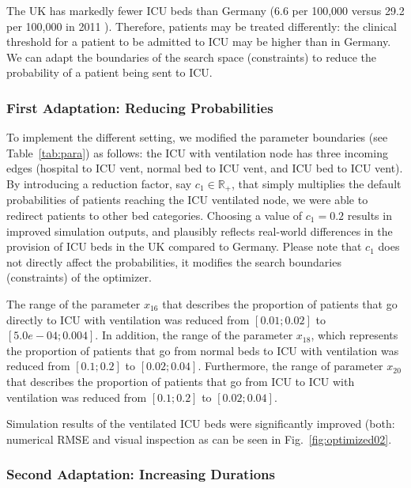 \documentclass[conference]{IEEEtran}
\begin{document}
The UK has markedly fewer ICU beds than Germany (6.6 per 100,000 versus 29.2 per 100,000 in 2011  \cite{rhodes_variability_2012}).
Therefore, patients may be treated differently: the clinical threshold for a patient to be admitted to ICU may be higher than in Germany. We can adapt the boundaries of the search space (constraints) to reduce the probability of a patient being sent to \gls{ICU}.

\subsubsection{First Adaptation: Reducing Probabilities}
To implement the different setting, we modified the parameter boundaries (see Table~\ref{tab:para})  as follows: the ICU with ventilation node has three incoming edges (hospital to ICU vent, normal bed to ICU vent, and ICU bed to ICU vent).
By introducing a reduction factor, say  $c_1 \in \mathbb{R_+}$, that simply multiplies the default probabilities of patients reaching the ICU ventilated node, we were able to redirect patients to other bed categories. 
Choosing a value of $c_1=0.2$ results in improved simulation outputs, and plausibly reflects real-world differences in the provision of ICU beds in the UK compared to Germany. Please note that $c_1$ does not directly affect the probabilities, it modifies the search boundaries (constraints) of the optimizer.

The range of the parameter 
$x_{16}$ that describes the proportion of patients that go directly to ICU with ventilation 
was reduced from $[0.01; 0.02]$ to $[5.0e-04; 0.004]$. In addition, the range of the parameter $x_{18}$, which represents the proportion of patients that go from normal beds to ICU with ventilation was reduced from $[0.1; 0.2]$ to $[0.02; 0.04]$. Furthermore, 
the range of parameter $x_{20}$ that describes the proportion of patients that go from ICU to ICU with ventilation was reduced from $[0.1; 0.2]$ to $[0.02; 0.04]$. 

Simulation results of the ventilated ICU beds were significantly improved (both: numerical RMSE and visual inspection as can be seen in Fig.~\ref{fig:optimized02}.

\subsubsection{Second Adaptation: Increasing Durations}
\end{document}
